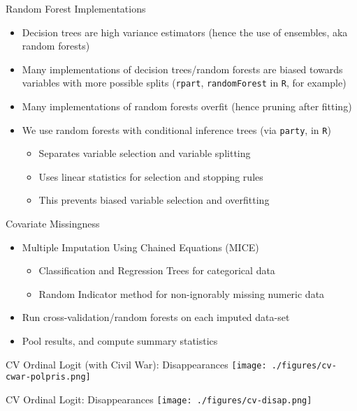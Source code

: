 \documentclass{beamer}
\begin{document}
\begin{frame}{Random Forest Implementations}
  \begin{itemize}
  \item Decision trees are high variance estimators (hence the use of ensembles, aka random forests)
  \item Many implementations of decision trees/random forests are biased towards variables with more possible splits (\texttt{rpart}, \texttt{randomForest} in \texttt{R}, for example)
  \item Many implementations of random forests overfit (hence pruning after fitting)
  \item We use random forests with conditional inference trees (via \texttt{party}, in \texttt{R})
    \begin{itemize}
    \item Separates variable selection and variable splitting
    \item Uses linear statistics for selection and stopping rules 
    \item This prevents biased variable selection and overfitting
    \end{itemize}
  \end{itemize}
\end{frame}

\begin{frame}{Covariate Missingness}
  \begin{itemize}
  \item Multiple Imputation Using Chained Equations (MICE)
    \begin{itemize}
    \item Classification and Regression Trees for categorical data
    \item Random Indicator method for non-ignorably missing numeric data
    \end{itemize}
  \item Run cross-validation/random forests on each imputed data-set
  \item Pool results, and compute summary statistics
  \end{itemize}
\end{frame}

\begin{frame}{CV Ordinal Logit (with Civil War): Disappearances}
  \centering
  \texttt{[image: ./figures/cv-cwar-polpris.png]}
\end{frame}

\begin{frame}{CV Ordinal Logit: Disappearances}
  \centering
  \texttt{[image: ./figures/cv-disap.png]}
\end{frame}
\end{document}

